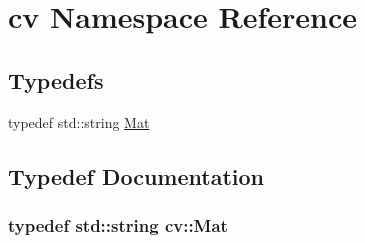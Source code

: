 \hypertarget{namespacecv}{}\section{cv Namespace Reference}
\label{namespacecv}
\subsection*{Typedefs}
\begin{DoxyCompactItemize}
\item 
typedef std\+::string \hyperlink{namespacecv_a60d81b54f4914bec4cc4a72ab77eb444}{Mat}
\end{DoxyCompactItemize}


\subsection{Typedef Documentation}
\hypertarget{namespacecv_a60d81b54f4914bec4cc4a72ab77eb444}{}
\subsubsection[{Mat}]{\setlength{\rightskip}{0pt plus 5cm}typedef std\+::string {\bf cv\+::\+Mat}}\label{namespacecv_a60d81b54f4914bec4cc4a72ab77eb444}
